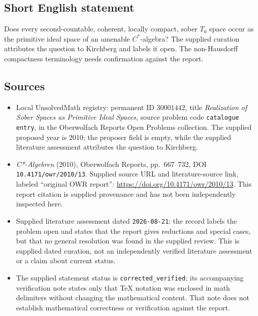 \documentclass[11pt]{article}
\begin{document}
\subsection{Short English statement}
Does every second-countable, coherent, locally compact, sober \(T_0\) space occur as the primitive ideal space of an amenable \(C^*\)-algebra? The supplied curation attributes the question to Kirchberg and labels it open. The non-Hausdorff compactness terminology needs confirmation against the report.
\subsection{Sources}
\begin{itemize}
\item Local UnsolvedMath registry: permanent ID \(30001442\), title \emph{Realization of Sober Spaces as Primitive Ideal Spaces}, source problem code \texttt{catalogue entry}, in the Oberwolfach Reports Open Problems collection. The supplied proposed year is 2010; the proposer field is empty, while the supplied literature assessment attributes the question to Kirchberg.
\item \emph{C*-Algebren} (2010), Oberwolfach Reports, pp.\ 667--732, DOI \texttt{10.4171/owr/2010/13}. Supplied source URL and literature-source link, labeled ``original OWR report'': \url{https://doi.org/10.4171/owr/2010/13}. This report citation is supplied provenance and has not been independently inspected here.
\item Supplied literature assessment dated \texttt{2026-08-21}: the record labels the problem open and states that the report gives reductions and special cases, but that no general resolution was found in the supplied review. This is supplied dated curation, not an independently verified literature assessment or a claim about current status.
\item The supplied statement status is \texttt{corrected\_verified}; its accompanying verification note states only that TeX notation was enclosed in math delimiters without changing the mathematical content. That note does not establish mathematical correctness or verification against the report.
\end{itemize}
\end{document}
